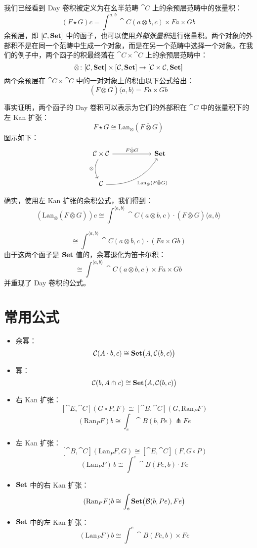 \documentclass[DaoFP]{subfiles}
\begin{document}
我们已经看到 Day 卷积被定义为在幺半范畴 $\cat C$ 上的余预层范畴中的张量积：
\[ (F \star G) c = \int^{a, b} \cat C (a \otimes b, c) \times F a \times G b \]
余预层，即 $[\mathcal{C}, \mathbf{Set}]$ 中的函子，也可以使用\emph{外部张量积}进行张量积。两个对象的外部积不是在同一个范畴中生成一个对象，而是在另一个范畴中选择一个对象。在我们的例子中，两个函子的积最终落在 $\cat C \times \cat C$ 上的余预层范畴中：
\[ \bar{\otimes} \colon [\mathcal{C}, \mathbf{Set}] \times [\mathcal{C}, \mathbf{Set}] \to [\mathcal{C} \times \mathcal{C}, \mathbf{Set}] \]
两个余预层在 $\cat C \times \cat C$ 中的一对对象上的积由以下公式给出：
\[ (F \bar{\otimes} G)\langle a, b \rangle = F a \times G b \]

事实证明，两个函子的 Day 卷积可以表示为它们的外部积在 $\cat C$ 中的张量积下的左 Kan 扩张：
\[ F \star G \cong \text{Lan}_{\otimes} (F \bar{ \otimes } G) \]
图示如下：
\[
 \begin{tikzcd} [row sep=1cm, column sep=1cm]
 \cat C \times \cat C
 \arrow[rr, "F \bar{\otimes} G", "" {name=ID, below} ]
 \arrow[d, bend right, "\otimes"']
 && \Set
 \\
 \cat C
  \arrow[urr, bend right, "\text{Lan}_{\otimes} (F \bar{ \otimes } G)"']
 \end{tikzcd}
\]

确实，使用左 Kan 扩张的余积公式，我们得到：
\[ (\text{Lan}_{\otimes} (F \bar{ \otimes } G)) c \cong \int^{\langle a, b\rangle} \cat C ( a \otimes b, c) \cdot (F \bar{ \otimes } G)\langle a, b\rangle\]

\[ \cong \int^{\langle a, b\rangle} \cat C ( a \otimes b, c) \cdot (F a \times G  b) \]
由于这两个函子是 $\mathbf{Set}$ 值的，余幂退化为笛卡尔积：
\[ \cong \int^{\langle a, b\rangle} \cat C ( a \otimes b, c) \times F a \times G  b \]
并重现了 Day 卷积的公式。

\section{常用公式}
\begin{itemize}
\item 余幂：
\[ \mathcal{C} (A \cdot b, c) \cong \mathbf{Set} \big( A, \mathcal{C} (b, c)\big) \]
\item 幂：
\[ \mathcal{C} (b, A \pitchfork c) \cong \mathbf{Set}  \big(A, \mathcal{C}(b, c)\big) \]
\item 右 Kan 扩张：
\[ [\cat E, \cat C](G \circ P, F) \cong [\cat B, \cat C](G, \text{Ran}_P F) \]
 \[ (\text{Ran}_P F) b \cong \int_e \cat B (b, P e) \pitchfork F e \]
\item 左 Kan 扩张：
\[ [\cat B, \cat C](\text{Lan}_P F , G) \cong  [\cat E, \cat C] (F, G \circ P) \]
\[ (\text{Lan}_P F)\, b \cong \int^{e} \cat B(P e, b) \cdot F e \]
\item $\mathbf{Set}$ 中的右 Kan 扩张：
  \[ (\text{Ran}_P F) b \cong \int_e \mathbf{Set} \big( \mathcal{B} (b, P e), F e\big) \]
\item $\mathbf{Set}$ 中的左 Kan 扩张：
\[ (\text{Lan}_P F) b \cong \int^{e} \cat B (P e, b) \times F e \]


\end{itemize}
\end{document}
